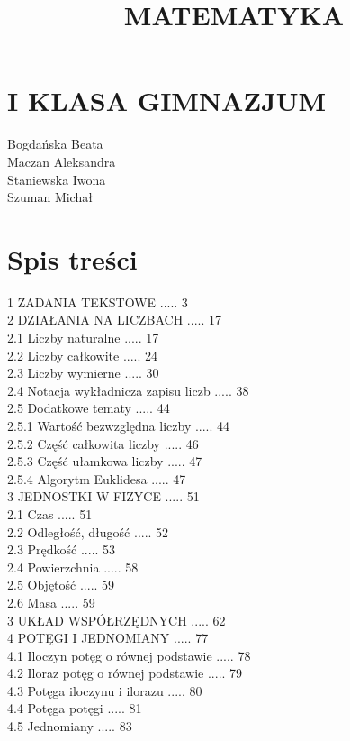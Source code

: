 \documentclass[10pt]{article}
\title{MATEMATYKA }
\author{}
\date{}
\begin{document}
\maketitle
\section*{I KLASA GIMNAZJUM}
Bogdańska Beata\\
Maczan Aleksandra\\
Staniewska Iwona\\
Szuman Michał

\section*{Spis treści}
1 ZADANIA TEKSTOWE ..... 3\\
2 DZIAŁANIA NA LICZBACH ..... 17\\
2.1 Liczby naturalne ..... 17\\
2.2 Liczby całkowite ..... 24\\
2.3 Liczby wymierne ..... 30\\
2.4 Notacja wykładnicza zapisu liczb ..... 38\\
2.5 Dodatkowe tematy ..... 44\\
2.5.1 Wartość bezwzględna liczby ..... 44\\
2.5.2 Część całkowita liczby ..... 46\\
2.5.3 Część ułamkowa liczby ..... 47\\
2.5.4 Algorytm Euklidesa ..... 47\\
3 JEDNOSTKI W FIZYCE ..... 51\\
2.1 Czas ..... 51\\
2.2 Odległość, długość ..... 52\\
2.3 Prędkość ..... 53\\
2.4 Powierzchnia ..... 58\\
2.5 Objętość ..... 59\\
2.6 Masa ..... 59\\
3 UKŁAD WSPÓŁRZĘDNYCH ..... 62\\
4 POTĘGI I JEDNOMIANY ..... 77\\
4.1 Iloczyn potęg o równej podstawie ..... 78\\
4.2 Iloraz potęg o równej podstawie ..... 79\\
4.3 Potęga iloczynu i ilorazu ..... 80\\
4.4 Potęga potęgi ..... 81\\
4.5 Jednomiany ..... 83\\
\end{document}
